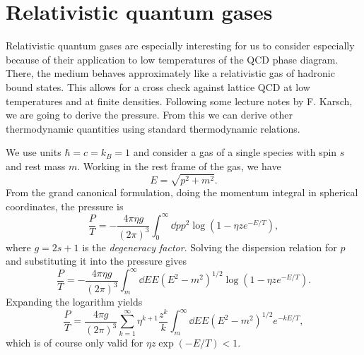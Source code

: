 \section{Relativistic quantum gases}

Relativistic quantum gases are especially interesting for us
to consider especially because of their
application to low temperatures of the QCD phase diagram. There, the medium
behaves approximately like a relativistic gas of hadronic bound states.
This allows for a cross check against lattice QCD at low temperatures
and at finite densities. Following some lecture notes by F. Karsch,
we are going to derive the
pressure. From this we can derive other thermodynamic quantities
using standard thermodynamic relations.

We use units $\hbar=c=k_B=1$ and consider a gas of a single species
with spin $s$ and rest mass $m$. Working in the rest frame of the gas,
we have
\begin{equation}\label{eq:dispersion}
  E=\sqrt{p^2+m^2}.  
\end{equation}
From the grand canonical formulation,
doing the momentum integral in spherical coordinates, the pressure is
\begin{equation}
  \frac{P}{T}=-\frac{4\pi\eta g}{(2\pi)^3}\int_0^\infty 
      \dd{p}p^2\log\left(1-\eta z e^{-E/T}\right),
\end{equation}
where $g=2s+1$ is the {\it degeneracy factor}. 
Solving the dispersion relation
for $p$ and substituting it into the pressure gives
\begin{equation}
  \frac{P}{T}=-\frac{4\pi\eta g}{(2\pi)^3}\int_m^\infty 
      \dd{E}E\left(E^2-m^2\right)^{1/2}\log\left(1-\eta z e^{-E/T}\right).
\end{equation}
Expanding the logarithm yields
\begin{equation}\label{eq:pressE}
  \frac{P}{T}=\frac{4\pi g}{(2\pi)^3}\sum_{k=1}^\infty\eta^{k+1}\frac{z^k}{k}\int_m^\infty 
      \dd{E}E\left(E^2-m^2\right)^{1/2}e^{-kE/T},
\end{equation}
which is of course only valid for $\eta z\exp(-E/T)<1$.

